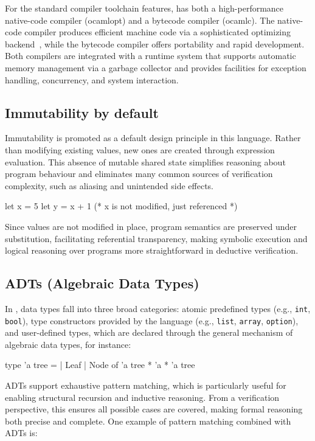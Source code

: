 For the standard compiler toolchain features, \ocaml has both a high-performance native-code compiler (\textsf{ocamlopt}) and a 
bytecode compiler (\textsf{ocamlc}). The native-code compiler produces efficient machine code via a sophisticated optimizing 
backend~\cite{abs-1011-1783}, while the bytecode compiler offers portability and rapid development. Both compilers are integrated 
with a runtime system that supports automatic memory management via a garbage collector and provides facilities for exception handling, 
concurrency, and system interaction.

\subsection{Immutability by default}

Immutability is promoted as a default design principle in this language. Rather than modifying existing values, new ones 
are created through expression evaluation. This absence of mutable shared state simplifies reasoning about program behaviour 
and eliminates many common sources of verification complexity, such as aliasing and unintended side effects.

\begin{ocamlenv}
  let x = 5
  let y = x + 1 (* x is not modified, just referenced *)
\end{ocamlenv}

Since values are not modified in place, program semantics are preserved under substitution, facilitating referential transparency, 
making symbolic execution and logical reasoning over programs more straightforward in deductive verification.

\subsection{ADTs (Algebraic Data Types)}
\label{subsec:ADT}

In \ocaml, data types fall into three broad categories: atomic predefined types (e.g., \texttt{int}, \texttt{bool}), type 
constructors provided by the language (e.g., \texttt{list}, \texttt{array}, \texttt{option}), and user-defined types, which 
are declared through the general mechanism of algebraic data types, for instance:

\begin{ocamlenv}
  type 'a tree =
    | Leaf
    | Node of 'a tree * 'a * 'a tree
\end{ocamlenv}

ADTs support exhaustive pattern matching, which is particularly useful for enabling structural recursion and inductive reasoning.
From a verification perspective, this ensures all possible cases are covered, making formal reasoning both precise and complete.
One example of pattern matching combined with ADTs is:

